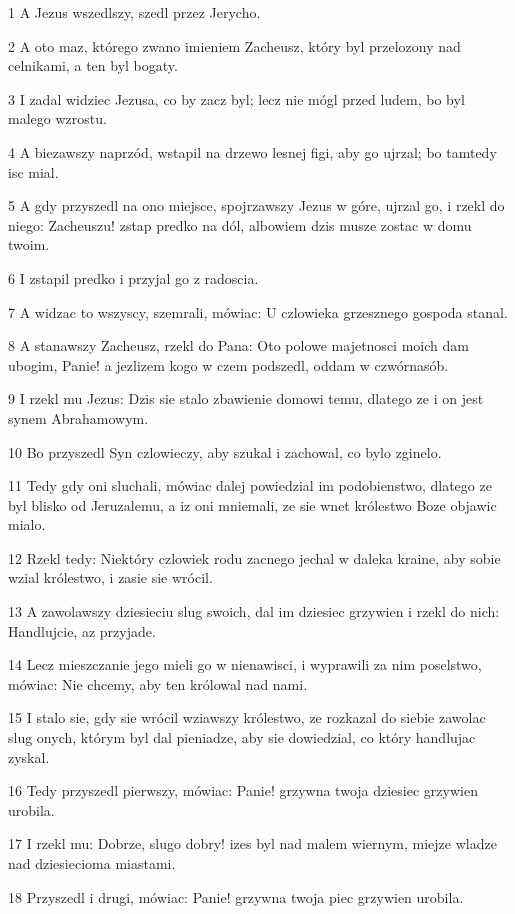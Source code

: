 \par 1 A Jezus wszedlszy, szedl przez Jerycho.
\par 2 A oto maz, którego zwano imieniem Zacheusz, który byl przelozony nad celnikami, a ten byl bogaty.
\par 3 I zadal widziec Jezusa, co by zacz byl; lecz nie mógl przed ludem, bo byl malego wzrostu.
\par 4 A biezawszy naprzód, wstapil na drzewo lesnej figi, aby go ujrzal; bo tamtedy isc mial.
\par 5 A gdy przyszedl na ono miejsce, spojrzawszy Jezus w góre, ujrzal go, i rzekl do niego: Zacheuszu! zstap predko na dól, albowiem dzis musze zostac w domu twoim.
\par 6 I zstapil predko i przyjal go z radoscia.
\par 7 A widzac to wszyscy, szemrali, mówiac: U czlowieka grzesznego gospoda stanal.
\par 8 A stanawszy Zacheusz, rzekl do Pana: Oto polowe majetnosci moich dam ubogim, Panie! a jezlizem kogo w czem podszedl, oddam w czwórnasób.
\par 9 I rzekl mu Jezus: Dzis sie stalo zbawienie domowi temu, dlatego ze i on jest synem Abrahamowym.
\par 10 Bo przyszedl Syn czlowieczy, aby szukal i zachowal, co bylo zginelo.
\par 11 Tedy gdy oni sluchali, mówiac dalej powiedzial im podobienstwo, dlatego ze byl blisko od Jeruzalemu, a iz oni mniemali, ze sie wnet królestwo Boze objawic mialo.
\par 12 Rzekl tedy: Niektóry czlowiek rodu zacnego jechal w daleka kraine, aby sobie wzial królestwo, i zasie sie wrócil.
\par 13 A zawolawszy dziesieciu slug swoich, dal im dziesiec grzywien i rzekl do nich: Handlujcie, az przyjade.
\par 14 Lecz mieszczanie jego mieli go w nienawisci, i wyprawili za nim poselstwo, mówiac: Nie chcemy, aby ten królowal nad nami.
\par 15 I stalo sie, gdy sie wrócil wziawszy królestwo, ze rozkazal do siebie zawolac slug onych, którym byl dal pieniadze, aby sie dowiedzial, co który handlujac zyskal.
\par 16 Tedy przyszedl pierwszy, mówiac: Panie! grzywna twoja dziesiec grzywien urobila.
\par 17 I rzekl mu: Dobrze, slugo dobry! izes byl nad malem wiernym, miejze wladze nad dziesiecioma miastami.
\par 18 Przyszedl i drugi, mówiac: Panie! grzywna twoja piec grzywien urobila.
